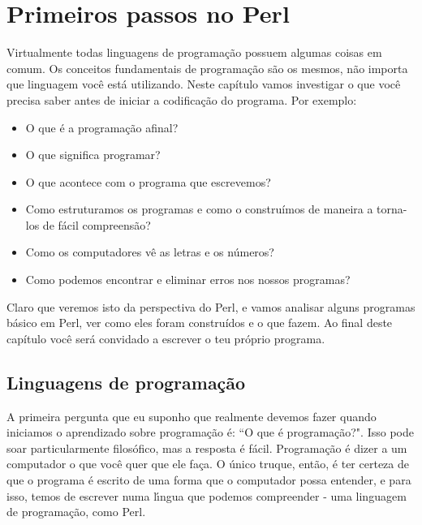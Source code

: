 \documentclass[a4paper,12pt,twoside]{book}
\newenvironment{intro}{\sffamily}{\vspace*{2ex minus 1.5ex}}
\begin{document}
  \chapter{Primeiros passos no Perl}

  \begin{intro}
    \noindent Virtualmente todas linguagens de programa\c{c}\~ao possuem algumas 
    coisas em comum. Os conceitos fundamentais de programa\c{c}\~ao s\~ao os mesmos, 
    n\~ao importa que linguagem voc\^e est\'a utilizando. Neste cap\'itulo vamos 
    investigar o que voc\^e precisa saber antes de iniciar a codifica\c{c}\~ao do programa. 
    Por exemplo:
 
    \begin{itemize}

      \item O que \'e a programa\c{c}\~ao afinal? 

      \item O que significa programar?

      \item O que acontece com o programa que escrevemos?

      \item Como estruturamos os programas e como o constru\'imos de maneira a torna-los de f\'acil compreens\~ao?

      \item Como os computadores v\^e as letras e os n\'umeros?

      \item Como podemos encontrar e eliminar erros nos nossos programas? 

    \end{itemize}

    \noindent Claro que veremos isto da perspectiva do Perl, e vamos analisar alguns
    programas b\'asico em Perl, ver como eles foram constru\'idos e o que fazem. Ao 
    final deste cap\'itulo voc\^e ser\'a convidado a escrever o teu pr\'oprio programa.
  \end{intro}

\section{Linguagens de programa\c{c}\~ao}

  \noindent A primeira pergunta que eu suponho que realmente devemos fazer quando 
  iniciamos o aprendizado sobre programa\c{c}\~ao \'e: ``O que \'e programa\c{c}\~ao?".
  Isso pode soar particularmente filos\'ofico, mas a resposta \'e f\'acil. 
  Programa\c{c}\~ao \'e dizer a um computador o que voc\^e quer que ele fa\c{c}a. 
  O \'unico truque, ent\~ao, \'e ter certeza de que o programa \'e escrito de uma forma 
  que o computador possa entender, e para isso, temos de escrever numa l\'{\i}ngua que 
  podemos compreender - uma linguagem de programa\c{c}\~ao, como Perl.\medskip
\end{document}
